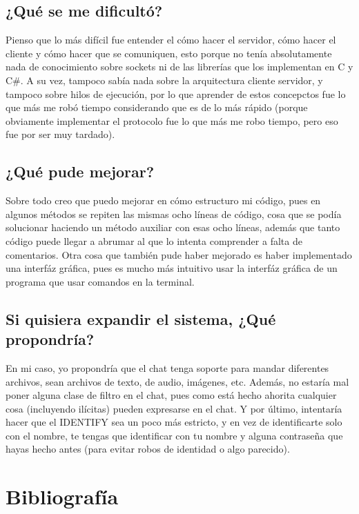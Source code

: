 \documentclass{article}
\begin{document}
\subsection{¿Qué se me dificultó?}
Pienso que lo más difícil fue entender el cómo hacer el servidor, cómo hacer el cliente y cómo hacer que se comuniquen, esto porque no tenía
absolutamente nada de conocimiento sobre sockets ni de las librerías que los implementan en C y C\#. A su vez, tampoco sabía nada sobre la
arquitectura cliente servidor, y tampoco sobre hilos de ejecución, por lo que aprender de estos concepctos fue lo que más me robó tiempo
considerando que es de lo más rápido (porque obviamente implementar el protocolo fue lo que más me robo tiempo, pero eso fue por ser muy
tardado).

\subsection{¿Qué pude mejorar?}
Sobre todo creo que puedo mejorar en cómo estructuro mi código, pues en algunos métodos se repiten las mismas ocho líneas de código, cosa que
se podía solucionar haciendo un método auxiliar con esas ocho líneas, además que tanto código puede llegar a abrumar al que lo intenta comprender
a falta de comentarios. Otra cosa que también pude haber mejorado es haber implementado una interfáz gráfica, pues es mucho más intuitivo usar
la interfáz gráfica de un programa que usar comandos en la terminal.

\subsection{Si quisiera expandir el sistema, ¿Qué propondría?}
En mi caso, yo propondría que el chat tenga soporte para mandar diferentes archivos, sean archivos de texto, de audio, imágenes, etc. Además, no
estaría mal poner alguna clase de filtro en el chat, pues como está hecho ahorita cualquier cosa (incluyendo ilícitas) pueden expresarse en el chat.
Y por último, intentaría hacer que el IDENTIFY sea un poco más estricto, y en vez de identificarte solo con el nombre, te tengas que identificar
con tu nombre y alguna contraseña que hayas hecho antes (para evitar robos de identidad o algo parecido).

\clearpage

\section{Bibliografía}
\end{document}

